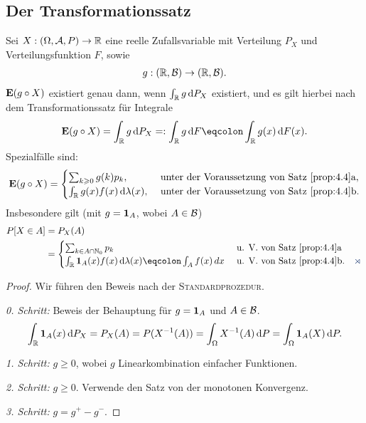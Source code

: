 \subsection{Der Transformationssatz}

\begin{prop}[Transformationssatz]
\label{prop:4.5}
Sei $X:(\Omega,\mathcal{A},P)\to \mathbb{R}$ eine reelle Zufallsvariable mit Verteilung
$P_{X}$ und Verteilungsfunktion $F$, sowie
\begin{align*}
g: (\mathbb{R}, \mathcal{B}) \to (\mathbb{R}, {\mathcal{B}}).
\end{align*}
$\textbf{E}(g \circ X)$ existiert genau dann,
wenn $\int_{\mathbb{R}} g\,\mathrm{d} P_{X}$ existiert, und es gilt hierbei nach dem
Transformationssatz für Integrale
\begin{align*}
\E(g \circ X) = \int_{\R}g\dP_{X} = : \int_{\R}g\dF\defr
\int_{\R}g(x)\dF(x).
\end{align*}
Spezialfälle sind:
\begin{align*}
\textbf{E}(g\circ X) =
\begin{cases}
\sum_{k\geqslant 0}g(k)p_{k}, & \mbox{ unter der Voraussetzung von Satz
\ref{prop:4.4}a},\\ \int_{\mathbb{R}}g(x)f(x)\,\mathrm{d} \lambda(x),
& \mbox{ unter der Voraussetzung von Satz \ref{prop:4.4}b}.
\end{cases}
\end{align*}
Insbesondere gilt (mit $g = \mathbf{1}_{A}$, wobei $A \in {\mathcal{B}}$)
\begin{align*}
P[X\in A] &=P_{X}(A) \\ &=
\begin{cases}
\sum_{k \in A\cap \N_{0}} p_{k} & \mbox{ u. V.
von Satz \ref{prop:4.4}a}\\
\int_{\R} \Id_{A} (x)f(x)\dlambda(x) \defr \int_{A}f(x)\,dx &
\mbox{ u. V. von Satz \ref{prop:4.4}b}.\fishhere
\end{cases}
\end{align*}
\end{prop}
\begin{proof}
Wir führen den Beweis nach der \textsc{Standardprozedur}.

\textit{0. Schritt:}
Beweis der Behauptung für $g=\mathbf{1}_A$ und $A\in\mathcal{B}$.
\begin{align*}
\int_{\mathbb{R}} \mathbf{1}_A(x) \,\mathrm{d} P_X = P_X(A) = P(X^{-1}(A))
= \int_\Omega X^{-1}(A)\,\mathrm{d} P = \int_\Omega \mathbf{1}_A(X) \,\mathrm{d} P. 
\end{align*}

\textit{1. Schritt:}
$g \ge 0$, wobei $g$ Linearkombination einfacher Funktionen.

\textit{2. Schritt:} $g\ge 0$. Verwende den Satz von der monotonen Konvergenz.

\textit{3. Schritt:} $g=g^+-g^-$.\qedhere
\end{proof}

